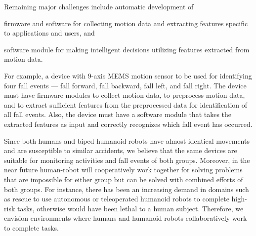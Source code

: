 \documentclass{IEEEtran}
\begin{document}
\par
Remaining major challenges include automatic development of \begin{inparaenum}[($i$)] \item firmware and software for collecting motion data and  extracting features specific to applications and users, and \item software module for making intelligent decisions utilizing features extracted from motion data. \end{inparaenum}
For example, a device with 9-axis MEMS motion sensor to be used for identifying four fall events --- fall forward, fall backward, fall left, and fall right. The device must have firmware modules to collect motion data, to preprocess motion data, and to extract sufficient features from the preprocessed data for identification of all fall events. Also, the device must have a software module that takes the extracted features as input and  correctly recognizes which fall event has occurred.


\par
Since both humans and biped humanoid robots have almost identical movements and are susceptible to 
similar accidents, we believe that the same devices are suitable for monitoring activities and fall events of both 
groups. Moreover, in the near future human-robot will cooperatively work together for solving problems that are impossible for either group but can be solved with  combined efforts of both groups.  For instance, there has been an increasing demand in 
domains such as rescue to use autonomous or teleoperated humanoid robots to complete high-risk 
tasks, otherwise would have been lethal to a human subject. Therefore, we envision environments 
where humans and humanoid robots collaboratively work to complete tasks. 
\end{document}

